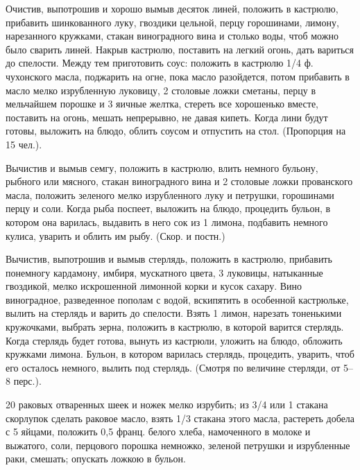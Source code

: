 
Очистив, выпотрошив и хорошо вымыв десяток линей, положить в кастрюлю, прибавить шинкованного луку, гвоздики цельной, перцу горошинами, лимону, нарезанного кружками, стакан виноградного вина и столько воды, чтоб можно было сварить линей. Накрыв кастрюлю, поставить на легкий огонь, дать вариться до спелости. Между тем приготовить соус: положить в кастрюлю 1/4 ф. чухонского масла, поджарить на огне, пока масло разойдется, потом прибавить в масло мелко изрубленную луковицу, 2 столовые ложки сметаны, перцу в мельчайшем порошке и 3 яичные желтка, стереть все хорошенько вместе, поставить на огонь, мешать непрерывно, не давая кипеть. Когда лини будут готовы, выложить на блюдо, облить соусом и отпустить на стол. (Пропорция на 15 чел.). 


Вычистив и вымыв семгу, положить в кастрюлю, влить немного бульону, рыбного или мясного, стакан виноградного вина и 2 столовые ложки прованского масла, положить зеленого мелко изрубленного луку и петрушки, горошинами перцу и соли. Когда рыба поспеет, выложить на блюдо, процедить бульон, в котором она варилась, выдавить в него сок из 1 лимона, подбавить немного кулиса, уварить и облить им рыбу. (Скор. и постн.) 


Вычистив, выпотрошив и вымыв стерлядь, положить в кастрюлю, прибавить понемногу кардамону, имбиря, мускатного цвета, 3 луковицы, натыканные гвоздикой, мелко искрошенной лимонной корки и кусок сахару. Вино виноградное, разведенное пополам с водой, вскипятить в особенной кастрюльке, вылить на стерлядь и варить до спелости. Взять 1 лимон, нарезать тоненькими кружочками, выбрать зерна, положить в кастрюлю, в которой варится стерлядь. Когда стерлядь будет готова, вынуть из кастрюли, уложить на блюдо, обложить кружками лимона. Бульон, в котором варилась стерлядь, процедить, уварить, чтоб его осталось немного, вылить под стерлядь. (Смотря по величине стерляди, от 5--8 перс.). 


20 раковых отваренных шеек и ножек мелко изрубить; из 3/4 или 1 стакана скорлупок сделать раковое масло, взять 1/3 стакана этого масла, растереть добела с 5 яйцами, положить 0,5 франц. белого хлеба, намоченного в молоке и выжатого, соли, перцового порошка немножко, зеленой петрушки и изрубленные раки, смешать; опускать ложкою в бульон. 

